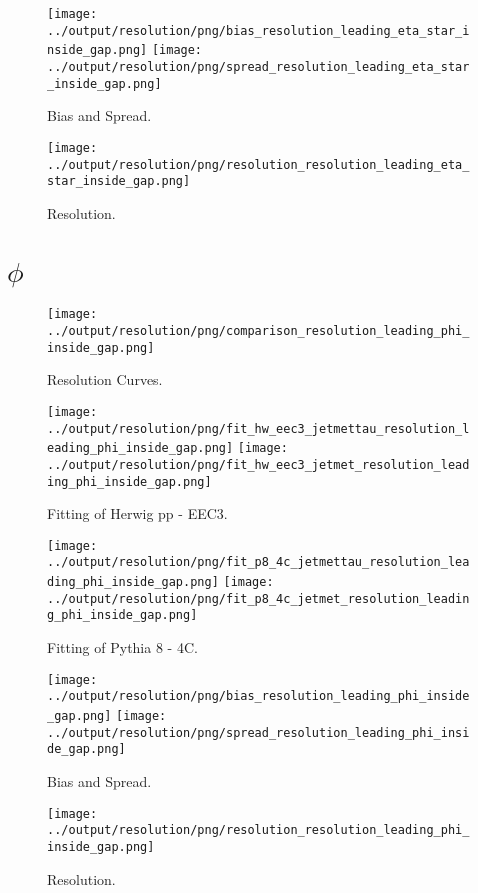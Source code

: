 \documentclass[11pt]{book}
\begin{document}
\begin{figure}[ht]
\centering
\texttt{[image: ../output/resolution/png/bias\_resolution\_leading\_eta\_star\_inside\_gap.png]}
\texttt{[image: ../output/resolution/png/spread\_resolution\_leading\_eta\_star\_inside\_gap.png]}
\caption{Bias and Spread.}
\end{figure}


\begin{figure}[ht]
\centering
\texttt{[image: ../output/resolution/png/resolution\_resolution\_leading\_eta\_star\_inside\_gap.png]}
\caption{Resolution.}
\end{figure}
\clearpage

\section{$\phi$}

\begin{figure}[ht]
\centering
\texttt{[image: ../output/resolution/png/comparison\_resolution\_leading\_phi\_inside\_gap.png]}
\caption{Resolution Curves.}
\end{figure}


\begin{figure}[ht]
\centering
\texttt{[image: ../output/resolution/png/fit\_hw\_eec3\_jetmettau\_resolution\_leading\_phi\_inside\_gap.png]}
\texttt{[image: ../output/resolution/png/fit\_hw\_eec3\_jetmet\_resolution\_leading\_phi\_inside\_gap.png]}
\caption{Fitting of Herwig pp - EEC3.}
\end{figure}

\begin{figure}[ht]
\centering
\texttt{[image: ../output/resolution/png/fit\_p8\_4c\_jetmettau\_resolution\_leading\_phi\_inside\_gap.png]}
\texttt{[image: ../output/resolution/png/fit\_p8\_4c\_jetmet\_resolution\_leading\_phi\_inside\_gap.png]}
\caption{Fitting of Pythia 8 - 4C.}
\end{figure}

\begin{figure}[ht]
\centering
\texttt{[image: ../output/resolution/png/bias\_resolution\_leading\_phi\_inside\_gap.png]}
\texttt{[image: ../output/resolution/png/spread\_resolution\_leading\_phi\_inside\_gap.png]}
\caption{Bias and Spread.}
\end{figure}


\begin{figure}[ht]
\centering
\texttt{[image: ../output/resolution/png/resolution\_resolution\_leading\_phi\_inside\_gap.png]}
\caption{Resolution.}
\end{figure}
\clearpage
\end{document}
